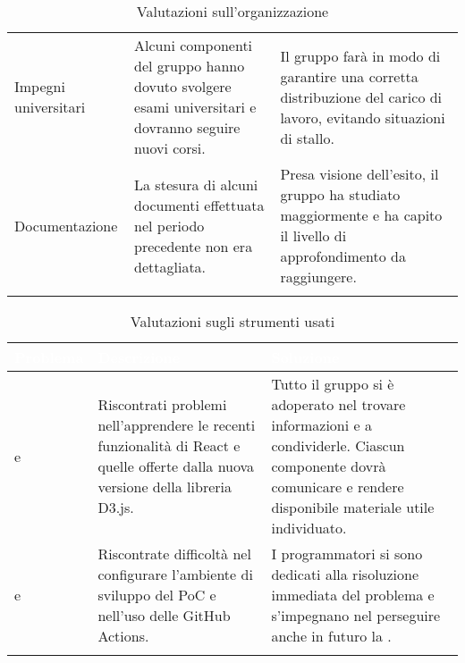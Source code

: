 \begin{itemize}
\begin{longtable}{C{3cm} C{6cm} C{6cm}}
Impegni universitari & 
Alcuni componenti del gruppo hanno dovuto svolgere esami universitari e dovranno seguire nuovi corsi. &
Il gruppo farà in modo di garantire una corretta distribuzione del carico di lavoro, evitando situazioni di stallo. \\

Documentazione & 
La stesura di alcuni documenti effettuata nel periodo precedente non era dettagliata. &
Presa visione dell'esito, il gruppo ha studiato maggiormente e ha capito il livello di approfondimento da raggiungere. \\

 \caption{Valutazioni sull'organizzazione}
\end{longtable}

\renewcommand{\arraystretch}{1.5}
\centering
\begin{longtable}{C{2.5cm} C{6cm} C{5cm}}
\textcolor{white}{\textbf{Problema}} &
\textcolor{white}{\textbf{Descrizione}} &	
\textcolor{white}{\textbf{Soluzione}} \\	
\endhead

 e  & 
Riscontrati problemi nell'apprendere le recenti funzionalità di React e quelle offerte dalla nuova versione della libreria D3.js. &
Tutto il gruppo si è adoperato nel trovare informazioni e a condividerle. Ciascun componente dovrà comunicare e rendere disponibile materiale utile individuato.  \\

 e  & 
Riscontrate difficoltà nel configurare l'ambiente di sviluppo del PoC e nell'uso delle GitHub Actions. &
I programmatori si sono dedicati alla risoluzione immediata del problema e s'impegnano nel perseguire anche in futuro la .  \\

 \caption{Valutazioni sugli strumenti usati}
\end{longtable}

\end{itemize}


